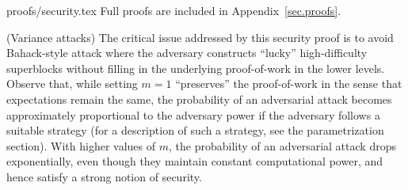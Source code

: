 \ifonecolumn
{proofs/security.tex}
\else
Full proofs are included in Appendix~\ref{sec.proofs}.
\fi

\begin{remark}{(Variance attacks)}
    \label{rmk.variance}
    The critical issue addressed by this security proof is to avoid Bahack-style
    attack \cite{bahack} where the adversary constructs ``lucky'' high-difficulty
    superblocks without filling in the underlying proof-of-work in the lower
    levels. Observe that, while setting $m = 1$ ``preserves'' the proof-of-work in
    the sense that expectations remain the same, the probability of an adversarial
    attack becomes approximately proportional to the adversary power if the
    adversary follows a suitable strategy (for a description of such a strategy,
    see the parametrization section). With higher values of $m$, the probability of
    an adversarial attack drops exponentially, even though they maintain constant
    computational power, and hence satisfy a strong notion of security.
\end{remark}

